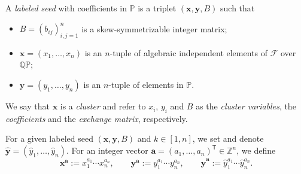 \documentclass[10pt,a4paper]{amsart}
\newcommand{\Z}{\mathbb{Z}}
\numberwithin{equation}{section}
\begin{document}
\begin{Definition}\label{D4}
 A {\it labeled seed} with coefficients in $\mathbb{P}$ is a triplet $(\mathbf{x},\mathbf{y},B)$ such that
 \begin{itemize}\itemsep=0pt
 \item $B=(b_{ij})_{i,j=1}^{n}$ is a skew-symmetrizable integer matrix;
 \item $\mathbf{x}=(x_1,\dots,x_n)$ is an $n$-tuple of algebraic independent elements of $\mathcal{F}$ over $\mathbb{QP}$;
 \item $\mathbf{y}=(y_1,\dots,y_n)$ is an $n$-tuple of elements in $\mathbb{P}$.

 \end{itemize}
We say that $\mathbf{x}$ is a {\it cluster} and refer to $x_i$, $y_i$ and $B$ as the {\it cluster variables}, the {\it coefficients}
and the {\it exchange matrix}, respectively.
\end{Definition}
For a given labeled seed $(\mathbf{x},\mathbf{y},B)$ and $k\in [1,n]$, we set
and denote ${\hat{\mathbf{y}}=(\hat{y}_1,\dots, \hat{y}_n)}$. For an integer vector $\mathbf{a}=(a_1,\dots, a_n)^{\mathsf T}\in \Z^n$, we define
\[
\mathbf{x}^\mathbf{a}:=x_1^{a_1}\cdots x_n^{a_n},\qquad \mathbf{y}^\mathbf{a}:=y_1^{a_1}\cdots y_n^{a_n},\qquad \hat{\mathbf{y}}^\mathbf{a}:=\hat{y}_1^{a_1}\cdots \hat{y}_n^{a_n}.
\]
\end{document}

